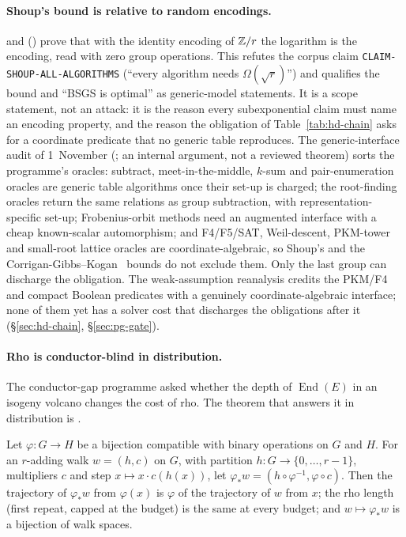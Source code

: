 \paragraph{Shoup's bound is relative to random encodings.}
 and
()
prove that with the identity encoding of $\mathbb{Z}/r$ the logarithm is the
encoding, read with zero group operations. This refutes the corpus claim
\texttt{CLAIM-SHOUP-ALL-ALGORITHMS} (``every algorithm needs
$\Omega(\sqrt r)$'') and qualifies the bound and ``BSGS is optimal'' as
generic-model statements. It is a scope statement, not an attack: it is the
reason every subexponential claim must name an encoding property, and the
reason the obligation of Table~\ref{tab:hd-chain} asks for a coordinate
predicate that no generic table reproduces. The generic-interface audit of
1~November (;
an internal argument, not a reviewed theorem) sorts the programme's oracles:
subtract, meet-in-the-middle, $k$-sum and pair-enumeration oracles are
generic table algorithms once their set-up is charged; the root-finding
oracles return the same relations as group subtraction, with
representation-specific set-up; Frobenius-orbit methods need an augmented
interface with a cheap known-scalar automorphism; and F4/F5/SAT, Weil-descent,
PKM-tower and small-root lattice oracles are coordinate-algebraic, so Shoup's
and the Corrigan-Gibbs--Kogan~\cite{cgk2018} bounds do not exclude them. Only
the last group can discharge the obligation. The weak-assumption reanalysis
credits the PKM/F4 and compact Boolean predicates with a genuinely
coordinate-algebraic interface; none of them yet has a solver cost that
discharges the obligations after it (\S\ref{sec:hd-chain},
\S\ref{sec:pg-gate}).

\paragraph{Rho is conductor-blind in distribution.} The conductor-gap
programme asked whether the depth of $\operatorname{End}(E)$ in an isogeny
volcano changes the cost of rho. The theorem that answers it in distribution
is .

\begin{theorem}\label{thm:hd-rhoinv}
Let $\varphi:G\to H$ be a bijection compatible with binary operations on
$G$ and $H$. For an $r$-adding walk $w=(h,c)$ on $G$, with partition
$h:G\to\{0,\ldots,r-1\}$, multipliers $c$ and step $x\mapsto x\cdot c(h(x))$,
let $\varphi_*w=(h\circ\varphi^{-1},\varphi\circ c)$. Then the trajectory of
$\varphi_*w$ from $\varphi(x)$ is $\varphi$ of the trajectory of $w$ from
$x$; the rho length (first repeat, capped at the budget) is the same at every
budget; and $w\mapsto\varphi_*w$ is a bijection of walk spaces.
\end{theorem}

